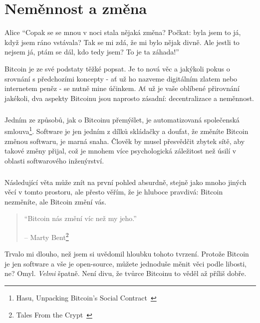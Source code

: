 \chapter{Neměnnost a změna}
\label{les:1}

\begin{chapquote}{Alice}
\enquote{Copak se se mnou v noci stala nějaká změna? Počkat: byla jsem to já, 
když jsem ráno vstávala? Tak se mi zdá, že mi bylo nějak divně. Ale jestli 
to nejsem já, ptám se dál, kdo tedy jsem? To je ta záhada!}
\end{chapquote}

Bitcoin je ze své podstaty těžké popsat. Je to nová věc a jakýkoli pokus 
o srovnání s předchozími koncepty - ať už ho nazveme digitálním zlatem nebo 
internetem peněz - se nutně mine účinkem. Ať už je vaše oblíbené přirovnání 
jakékoli, dva aspekty Bitcoinu jsou naprosto zásadní: decentralizace a neměnnost.

\paragraph{}
Jedním ze způsobů, jak o Bitcoinu přemýšlet, je automatizovaná společenská smlouva\footnote{Hasu,
Unpacking Bitcoin's Social Contract~\cite{social-contract}}. Software je jen 
jedním z dílků skládačky a doufat, že změníte Bitcoin změnou softwaru, je marná 
snaha. Člověk by musel přesvědčit zbytek sítě, aby takové změny přijal, což je 
mnohem více psychologická záležitost než úsilí v oblasti softwarového inženýrství.

\paragraph{}
Následující věta může znít na první pohled absurdně, stejně jako mnoho jiných věcí 
v tomto prostoru, ale přesto věřím, že je hluboce pravdivá: Bitcoin nezměníte, 
ale Bitcoin změní vás.

\begin{quotation}\begin{samepage}
\enquote{Bitcoin nás změní víc než my jeho.}
\begin{flushright} -- Marty Bent\footnote{Tales From the Crypt~\cite{tftc21}}
\end{flushright}\end{samepage}\end{quotation}

Trvalo mi dlouho, než jsem si uvědomil hloubku tohoto tvrzení. Protože Bitcoin 
je jen software a vše je open-source, můžete jednoduše měnit věci podle libosti, 
ne? Omyl. \textit{Velmi} špatně. Není divu, že tvůrce Bitcoinu to věděl až příliš dobře.

